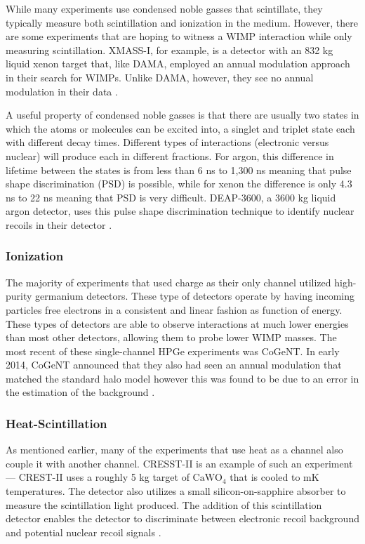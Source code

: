 While many experiments use condensed noble gasses that scintillate, they typically measure both scintillation and ionization in the medium.  However, there are some experiments that are hoping to witness a WIMP interaction while only measuring scintillation.  XMASS-I, for example, is a detector with an 832 kg liquid xenon target that, like DAMA, employed an annual modulation approach in their search for WIMPs.  Unlike DAMA, however, they see no annual modulation in their data \cite{xmass2016direct}.  

A useful property of condensed noble gasses is that there are usually two states in which the atoms or molecules can be excited into, a singlet and triplet state each with different decay times.  Different types of interactions (electronic versus nuclear) will produce each in different fractions.  For argon, this difference in lifetime between the states is from less than 6 ns to 1,300 ns \cite{heindl2011table} meaning that pulse shape discrimination (PSD) is possible, while for xenon the difference is only 4.3 ns to 22 ns meaning that PSD is very difficult.  DEAP-3600, a 3600 kg liquid argon detector, uses this pulse shape discrimination technique to identify nuclear recoils in their detector \cite{amaudruz2017first}.     


\subsubsection{Ionization}

The majority of experiments that used charge as their only channel utilized high-purity germanium detectors.  These type of detectors operate by having incoming particles free electrons in a consistent and linear fashion as function of energy.  These types of detectors are able to observe interactions at much lower energies than most other detectors, allowing them to probe lower WIMP masses.  The most recent of these single-channel HPGe experiments was CoGeNT.  In early 2014, CoGeNT announced that they also had seen an annual modulation that matched the standard halo model \cite{aalseth2014search} however this was found to be due to an error in the estimation of the background \cite{aalseth2014maximum}.


\subsubsection{Heat-Scintillation}

As mentioned earlier, many of the experiments that use heat as a channel also couple it with another channel.  CRESST-II is an example of such an experiment --- CREST-II uses a roughly 5 kg target of $\textrm{CaWO}_4$ that is cooled to mK temperatures.  The detector also utilizes a small silicon-on-sapphire absorber to measure the scintillation light produced.  The addition of this scintillation detector enables the detector to discriminate between electronic recoil background and potential nuclear recoil signals \cite{strauss2016exploring}.  

